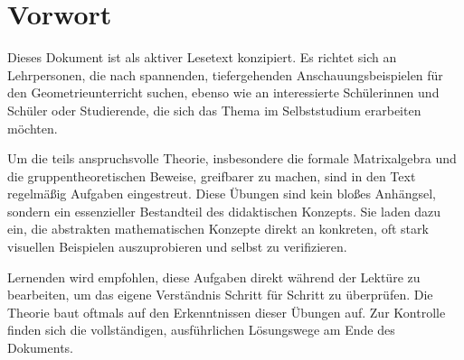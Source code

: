 \section*{Vorwort}


Dieses Dokument ist als aktiver Lesetext konzipiert. Es richtet sich an Lehrpersonen, die nach spannenden, tiefergehenden Anschauungsbeispielen für den Geometrieunterricht suchen, ebenso wie an interessierte Schülerinnen und Schüler oder Studierende, die sich das Thema im Selbststudium erarbeiten möchten.

Um die teils anspruchsvolle Theorie, insbesondere die formale Matrixalgebra und die gruppentheoretischen Beweise, greifbarer zu machen, sind in den Text regelmäßig Aufgaben eingestreut. Diese Übungen sind kein bloßes Anhängsel, sondern ein essenzieller Bestandteil des didaktischen Konzepts. Sie laden dazu ein, die abstrakten mathematischen Konzepte direkt an konkreten, oft stark visuellen Beispielen auszuprobieren und selbst zu verifizieren. 

Lernenden wird empfohlen, diese Aufgaben direkt während der Lektüre zu bearbeiten, um das eigene Verständnis Schritt für Schritt zu überprüfen. Die Theorie baut oftmals auf den Erkenntnissen dieser Übungen auf. Zur Kontrolle finden sich die vollständigen, ausführlichen Lösungswege am Ende des Dokuments. 
